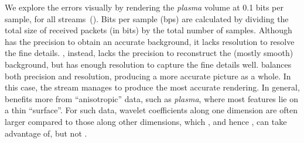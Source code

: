 We explore the errors visually by rendering the \emph{plasma} volume at 0.1 bits per sample, for all
streams~(). Bits per sample (bps) are calculated by dividing the total size
of received packets (in bits) by the total number of samples.  Although \slvl has the precision to obtain an accurate background, it
lacks resolution to resolve the fine details. \sbit, instead, lacks the precision to reconstruct the
(mostly smooth) background, but has enough resolution to capture the fine details well. \swav
balances both precision and resolution, producing a more accurate picture as a whole. In this case,
the \ssig stream manages to produce the most accurate rendering. In general, \ssig benefits more
from ``anisotropic'' data, such as \emph{plasma}, where most features lie on a thin ``surface''. For
such data, wavelet coefficients along one dimension are often larger compared to those along other
dimensions, which \sopt, and hence \ssig, can take advantage of, but not \swav.
